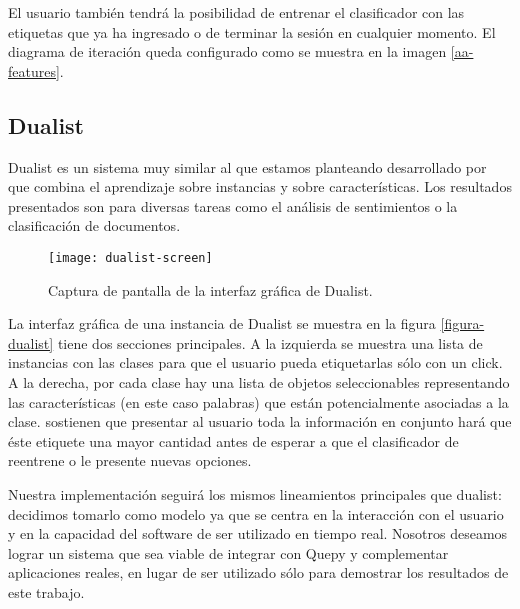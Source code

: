 El usuario también tendrá la posibilidad de entrenar el clasificador con las etiquetas que ya ha ingresado o de terminar la sesión en cualquier momento. El diagrama de iteración queda configurado como se muestra en la imagen \ref{aa-features}.

\subsection{Dualist}

Dualist es un sistema muy similar al que estamos planteando desarrollado por \citet{dualist} que combina el aprendizaje sobre instancias y sobre características. Los resultados presentados son para diversas tareas como el análisis de sentimientos o la clasificación de documentos.

\begin{figure}[h!]
\caption{Captura de pantalla de la interfaz gráfica de Dualist.}
\texttt{[image: dualist-screen]}
\centering
\end{figure}

La interfaz gráfica de una instancia de Dualist se muestra en la figura \ref{figura-dualist} tiene dos secciones principales. A la izquierda se muestra una lista de instancias con las clases para que el usuario pueda etiquetarlas sólo con un click. A la derecha, por cada clase hay una lista de objetos seleccionables representando las características (en este caso palabras) que están potencialmente asociadas a la clase. \citet{dualist} sostienen que presentar al usuario toda la información en conjunto hará que éste etiquete una mayor cantidad antes de esperar a que el clasificador de reentrene o le presente nuevas opciones.

Nuestra implementación seguirá los mismos lineamientos principales que dualist: decidimos tomarlo como modelo ya que se centra en la interacción con el usuario y en la capacidad del software de ser utilizado en tiempo real. Nosotros deseamos lograr un sistema que sea viable de integrar con Quepy y complementar aplicaciones reales, en lugar de ser utilizado sólo para demostrar los resultados de este trabajo.

